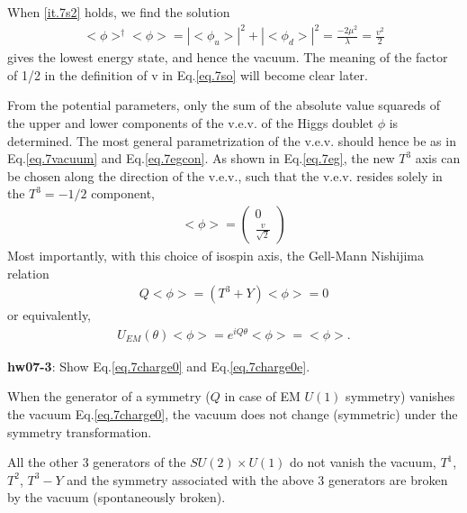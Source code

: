 \documentclass[12pt]{article}
\begin{document}
  When \ref{it.7s2} holds, we find the solution
\begin{eqnarray}
  <\phi>^\dagger <\phi> = |<\phi_u>|^2 + |<\phi_d>|^2
                            = \frac{-2\mu^2}{\lambda}
                            = \frac{v^2}{2} \label{eq.7so}
\end{eqnarray}
  gives the lowest energy state, and hence the vacuum.
  The meaning of the factor of 1/2 in the definition of v in
  Eq.\ref{eq.7so} will become clear later.

  From the potential parameters, only the sum of the absolute
  value squareds of the upper and lower components of the v.e.v.
  of the Higgs doublet $\phi$ is determined.  The most general
  parametrization of the v.e.v. should hence be as in Eq.\ref{eq.7vacuum}
  and Eq.\ref{eq.7egcon}.  As shown in Eq.\ref{eq.7eg}, the new $T^3$ axis can be chosen along the direction of the v.e.v., such that the v.e.v. resides
  solely in the $T^3 = -1/2$ component,
\begin{eqnarray}
  <\phi> = 
  \begin{pmatrix}
    0 \\ \frac{v}{\sqrt 2}
      \end{pmatrix}
\end{eqnarray}
  Most importantly, with this choice of isospin axis,
  the Gell-Mann Nishijima relation
\begin{eqnarray}
  Q <\phi> = (T^3 + Y) <\phi> = 0 \label{eq.7charge0}
\end{eqnarray}
  or equivalently,
\begin{eqnarray}
  U_{EM}(\theta) <\phi> = e^{iQ\theta} <\phi> = <\phi>. \label{eq.7charge0e}
\end{eqnarray}


{\bf hw07-3}: Show Eq.\ref{eq.7charge0} and Eq.\ref{eq.7charge0e}.

  When the generator of a symmetry ($Q$ in case of EM $U(1)$ symmetry)
  vanishes the vacuum Eq.\ref{eq.7charge0}, the vacuum does not change (symmetric) under the symmetry transformation.

  All the other 3 generators of the $SU(2)\times U(1)$ do not vanish
  the vacuum,
  $T^1$,$T^2$, $T^3-Y$
  and the symmetry associated with the above 3 generators are
  broken by the vacuum (spontaneously broken).
\end{document}
